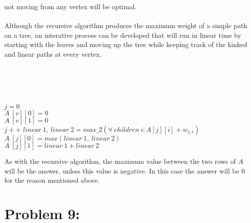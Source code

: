 \documentclass[12pt]{article}
\begin{document}
not moving from any vertex will be optimal.\\\\
Although the recursive algorithm produces the maximum weight of a simple path
on a tree, an interative process can be developed that will run in linear
time by starting with the leaves and moving up the tree while keeping
track of the kinked and linear paths at every vertex.\\\\
\begin{algorithm}[H]
\\
\\
\\
$j = 0$\\
{$A\ [v][0] = 0$\\
$A\ [v][1] = 0$\\
$j++$}
{$linear\ 1,\ linear\ 2 = max\_2(\forall\ children\ i: A[j][i]+w_{j,i})$\\
$A\ [j][0] = max(linear\ 1,\ linear\ 2)$\\
$A\ [j][1] = linear\ 1 + linear\ 2$\\
}
\end{algorithm}
As with the recursive algorithm, the maximum value between the two rows of $A$
will be the answer, unless this value is negative.  In this case the answer
will be $0$ for the reason mentioned above.

\section*{Problem 9: }
\end{document}
